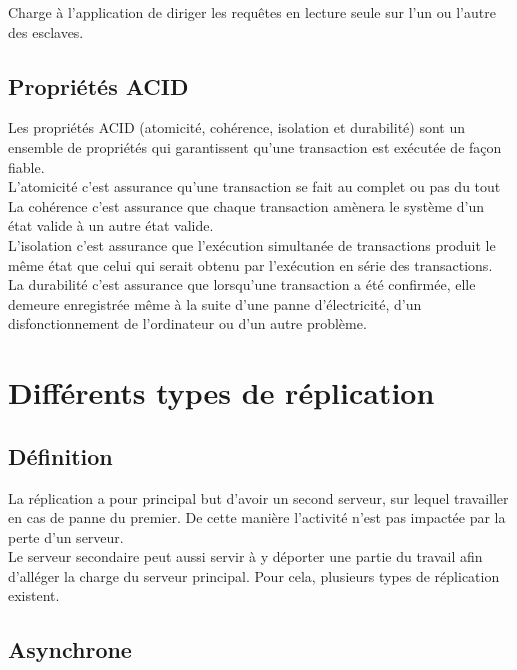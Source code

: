 \documentclass[12pt]{report}
\begin{document}
 Charge à l'application de diriger les requêtes en lecture seule sur l'un ou
 l'autre des esclaves. \\


\subsection{Propriétés ACID}


Les propriétés ACID (atomicité, cohérence, isolation et durabilité) sont un
ensemble de propriétés qui garantissent qu'une transaction est exécutée de façon
fiable.\\

L’atomicité c’est assurance qu'une transaction se fait au complet ou pas du tout
La cohérence c’est assurance que chaque transaction amènera le système d'un état
valide à un autre état valide.\\

L’isolation c’est assurance que l'exécution simultanée de transactions produit
le même état que celui qui serait obtenu par l'exécution en série des
transactions.\\

La durabilité c’est assurance que lorsqu’une transaction a été confirmée, elle
demeure enregistrée même à la suite d'une panne d'électricité, d'un
disfonctionnement de l'ordinateur ou d'un autre problème.


\section{Différents types de réplication}


\subsection{Définition}

La réplication a pour principal but d’avoir un second serveur, sur lequel
travailler en cas de panne du premier. De cette manière l'activité n’est pas
impactée par la perte d'un serveur.\\

Le serveur secondaire peut aussi servir à y déporter une partie du travail afin
d'alléger la charge du serveur principal. Pour cela, plusieurs types de
réplication existent.\\

\subsection{Asynchrone}
\end{document}
